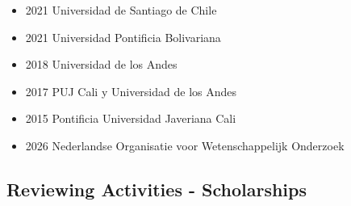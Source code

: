 {\begin{itemize}
\item 2021 Universidad de Santiago de Chile
\end{itemize}
}

{\begin{itemize}
\item 2021 Universidad Pontificia Bolivariana
\item 2018 Universidad de los Andes
\item 2017 PUJ Cali y Universidad de los Andes
\item 2015 Pontificia Universidad Javeriana Cali
\end{itemize}
}

{\begin{itemize}
\item 2026 Nederlandse Organisatie voor Wetenschappelijk Onderzoek
\end{itemize}
}

\clearpage

\subsection{Reviewing Activities - Scholarships}

